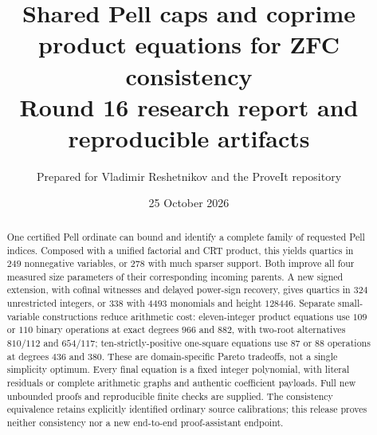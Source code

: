 \documentclass[11pt,a4paper]{article}
\title{Shared Pell caps and coprime product equations for ZFC consistency\\[8pt]\large Round 16 research report and reproducible artifacts}
\author{Prepared for Vladimir Reshetnikov and the ProveIt repository}
\date{25 October 2026}
\theoremstyle{remark}\newtheorem{remark}[theorem]{Remark}
\begin{document}
\maketitle
\begin{abstract}
One certified Pell ordinate can bound and identify a complete family of requested Pell indices. Composed with a unified factorial and CRT product, this yields quartics in $249$ nonnegative variables, or $278$ with much sparser support. Both improve all four measured size parameters of their corresponding incoming parents. A new signed extension, with cofinal witnesses and delayed power-sign recovery, gives quartics in $324$ unrestricted integers, or $338$ with $4493$ monomials and height $128446$. Separate small-variable constructions reduce arithmetic cost: eleven-integer product equations use $109$ or $110$ binary operations at exact degrees $966$ and $882$, with two-root alternatives $810/112$ and $654/117$; ten-strictly-positive one-square equations use $87$ or $88$ operations at degrees $436$ and $380$. These are domain-specific Pareto tradeoffs, not a single simplicity optimum. Every final equation is a fixed integer polynomial, with literal residuals or complete arithmetic graphs and authentic coefficient payloads. Full new unbounded proofs and reproducible finite checks are supplied. The consistency equivalence retains explicitly identified ordinary source calibrations; this release proves neither consistency nor a new end-to-end proof-assistant endpoint.
\end{abstract}
\clearpage
\tableofcontents
\clearpage











\end{document}
